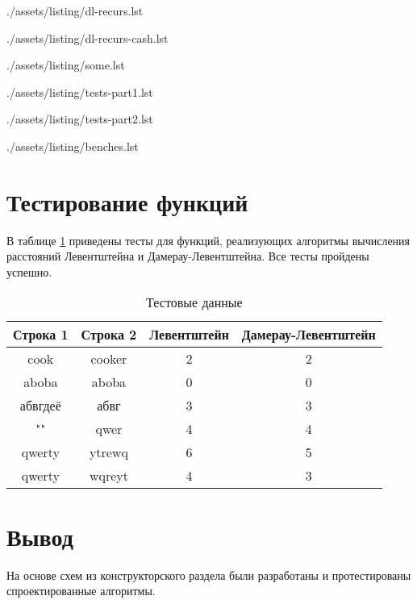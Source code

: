 \clearpage
\begin{lstinputlisting}[
	caption={Рекурсивный алгоритм Дамерау-Левентштейна},
	label={lst:dl-recurs},
	style={golang}
]{./assets/listing/dl-recurs.lst}
\end{lstinputlisting}

\clearpage
\begin{lstinputlisting}[
	caption={Рекурсивный алгоритм с кэшем Дамерау-Левентштейна},
	label={lst:dl-recurs-cash},
	style={golang}
]{./assets/listing/dl-recurs-cash.lst}
\end{lstinputlisting}

\clearpage
\begin{lstinputlisting}[
	caption={Вспомогательные функции для расчёта расстояний},
	label={lst:some},
	style={golang}
]{./assets/listing/some.lst}
\end{lstinputlisting}

\clearpage
\begin{lstinputlisting}[
	caption={Пример реализации тестов},
	label={lst:tests},
	style={golang}
]{./assets/listing/tests-part1.lst}
\end{lstinputlisting}

\clearpage
\begin{lstinputlisting}[
	style={golang}
]{./assets/listing/tests-part2.lst}
\end{lstinputlisting}

\clearpage
\begin{lstinputlisting}[
	caption={Пример реализации бенчмарка},
	label={lst:benches},
	style={golang}
]{./assets/listing/benches.lst}
\end{lstinputlisting}

\clearpage
\section{Тестирование функций}

В таблице \ref{tbl:test} приведены тесты для функций, реализующих алгоритмы вычисления расстояний Левентштейна и Дамерау-Левентштейна.
Все тесты пройдены успешно.

\begin{table}[h!]
	\begin{center}
		\caption{\label{tbl:test}Тестовые данные}
		\begin{tabular}{|c|c|c|c|}
			\hline
			\bfseries Строка 1 & \bfseries Строка 2 & \bfseries Левентштейн & \bfseries Дамерау-Левентштейн \\ 
			\hline
			cook & cooker & 2 & 2 \\ \hline
			aboba & aboba & 0 & 0 \\ \hline
			абвгдеё & абвг & 3 & 3 \\ \hline
			"" & qwer & 4 & 4 \\ \hline %
			qwerty & ytrewq & 6 & 5 \\ \hline
			qwerty & wqreyt & 4 & 3 \\ \hline
		\end{tabular}
	\end{center}
\end{table}

\section*{Вывод}

На основе схем из конструкторского раздела были разработаны и протестированы спроектированные алгоритмы.
